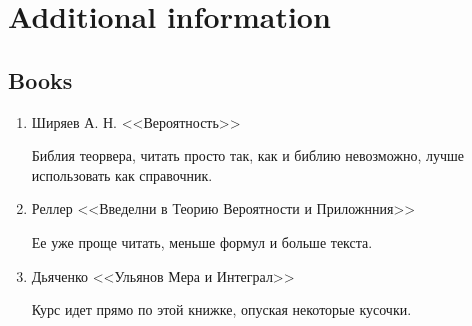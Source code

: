 \newpage
\section{Additional information}

\subsection{Books}

\begin{enumerate}
	\item Ширяев А. Н. <<Вероятность>>
		
		Библия теорвера, читать просто так, как и библию невозможно, лучше использовать как справочник.

	\item  Реллер <<Введелни в Теорию Вероятности и Приложнния>>

		Ее уже проще читать, меньше формул и больше текста.

	\item Дьяченко <<Ульянов Мера и Интеграл>>

		Курс идет прямо по этой книжке, опуская некоторые кусочки.

\end{enumerate}
